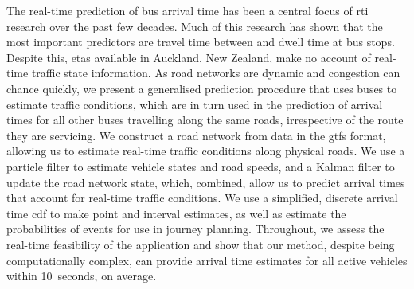 The real-time prediction of bus arrival time has been a central focus of \gls{rti} research over the past few decades. Much of this research has shown that the most important predictors are travel time between and dwell time at bus stops. Despite this, \glspl{eta} available in Auckland, New Zealand, make no account of real-time traffic state information. As road networks are dynamic and congestion can chance quickly, we present a generalised prediction procedure that uses buses to estimate traffic conditions, which are in turn used in the prediction of arrival times for all other buses travelling along the same roads, irrespective of the route they are servicing. We construct a road network from data in the \gls{gtfs} format, allowing us to estimate real-time traffic conditions along physical roads. We use a particle filter to estimate vehicle states and road speeds, and a Kalman filter to update the road network state, which, combined, allow us to predict arrival times that account for real-time traffic conditions. We use a simplified, discrete arrival time \gls{cdf} to make point and interval estimates, as well as estimate the probabilities of events for use in journey planning. Throughout, we assess the real-time feasibility of the application and show that our method, despite being computationally complex, can provide arrival time estimates for all active vehicles within 10~seconds, on average.

